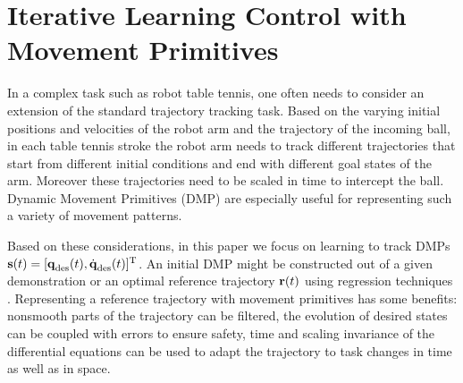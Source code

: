 \section{Iterative Learning Control with Movement Primitives}\label{method}

In a complex task such as robot table tennis, one often needs to consider an extension of the standard trajectory tracking task. Based on the varying initial positions and velocities of the robot arm and the trajectory of the incoming ball, in each table tennis stroke the robot arm needs to track different trajectories that start from different initial conditions and end with different goal states of the arm. Moreover these trajectories need to be scaled in time to intercept the ball. Dynamic Movement Primitives (DMP) are especially useful for representing such a variety of movement patterns.


Based on these considerations, in this paper we focus on learning to track DMPs $\boldsymbol{\mathrm{s}}(t) = [\boldsymbol{\mathrm{q}}_{\text{des}}(t),\dot{\boldsymbol{\mathrm{q}}}_{\text{des}}(t)]^{\mathrm{T}}$. An initial DMP might be constructed out of a given demonstration or an optimal reference trajectory $\boldsymbol{\mathrm{r}}(t)$ using regression techniques \cite{Ijspeert13}. Representing a reference trajectory with movement primitives has some benefits: nonsmooth parts of the trajectory can be filtered, the evolution of desired states can be coupled with errors to ensure safety, time and scaling invariance of the differential equations can be used to adapt the trajectory to task changes in time as well as in space. %

